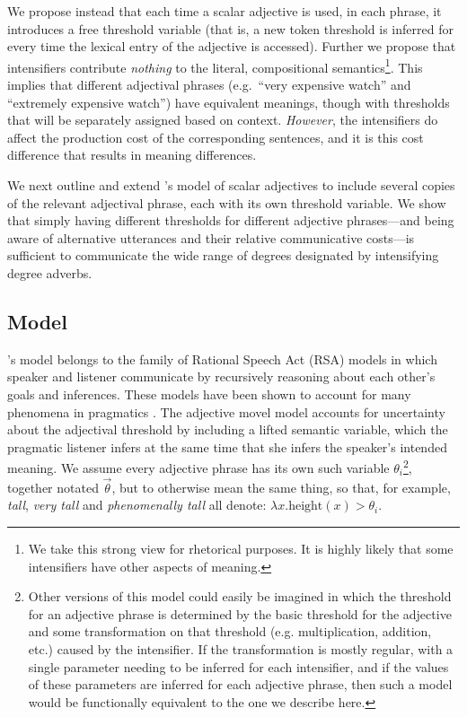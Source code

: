 \documentclass[10pt,letterpaper]{article}
\newcommand{\w}[1]{\emph{#1}}
\begin{document}
We propose instead that each time a scalar adjective is used, in each phrase, it introduces a free threshold variable (that is, a new token threshold is inferred for every time the lexical entry of the adjective is accessed). Further we propose that intensifiers contribute \emph{nothing} to the literal, compositional semantics\footnote{We take this strong view for rhetorical purposes. It is highly likely that some intensifiers have other aspects of meaning.}. This implies that different adjectival phrases (e.g.~``very expensive watch'' and ``extremely expensive watch'') have equivalent meanings, though with thresholds that will be separately assigned based on context. \emph{However}, the intensifiers do affect the production cost of the corresponding sentences, and it is this cost difference that results in meaning differences.

We next outline and extend 's model of scalar adjectives to include several copies of the relevant adjectival phrase, each with its own threshold variable.
We show that simply having different thresholds for different adjective phrases---and being aware of alternative utterances and their relative communicative costs---is sufficient to communicate the wide range of degrees designated by intensifying degree adverbs.

\subsection{Model}

's model belongs to the family of Rational Speech Act (RSA) models in which speaker and listener communicate by recursively reasoning about each other's goals and inferences. These models have been shown to account for many phenomena in pragmatics \cite{frank, goodman}. The adjective movel model accounts for uncertainty about the adjectival threshold by including a lifted semantic variable, which the pragmatic listener infers at the same time that she infers the speaker's intended meaning. 
We assume every adjective phrase has its own such variable $\theta_i$\footnote{Other versions of this model could easily be imagined in which the threshold for an adjective phrase is determined by the basic threshold for the adjective and some transformation on that threshold (e.g. multiplication, addition, etc.) caused by the intensifier. If the transformation is mostly regular, with a single parameter needing to be inferred for each intensifier, and if the values of these parameters are inferred for each adjective phrase, then such a model would be functionally equivalent to the one we describe here.}, together notated $\vec{\theta}$, but to otherwise mean the same thing, so that, for example, \w{tall}, \w{very tall} and \w{phenomenally tall} all denote: $\lambda x . \text{height}(x) > \theta_i$.
\end{document}
